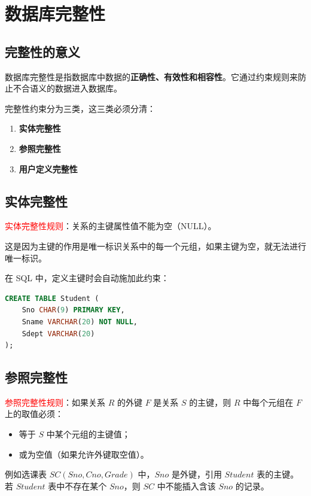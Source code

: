 \documentclass{../../note}
\begin{document}
\section{数据库完整性}

\subsection{完整性的意义}

数据库完整性是指数据库中数据的\textbf{正确性、有效性和相容性}。它通过约束规则来防止不合语义的数据进入数据库。

完整性约束分为三类，这三类必须分清：

\begin{enumerate}
  \item \textbf{实体完整性}
  \item \textbf{参照完整性}
  \item \textbf{用户定义完整性}
\end{enumerate}

\subsection{实体完整性}

\textcolor{red}{实体完整性规则}：关系的主键属性值不能为空（NULL）。

这是因为主键的作用是唯一标识关系中的每一个元组，如果主键为空，就无法进行唯一标识。

在 SQL 中，定义主键时会自动施加此约束：

\begin{lstlisting}[language=SQL]
CREATE TABLE Student (
    Sno CHAR(9) PRIMARY KEY,
    Sname VARCHAR(20) NOT NULL,
    Sdept VARCHAR(20)
);
\end{lstlisting}

\subsection{参照完整性}

\textcolor{red}{参照完整性规则}：如果关系 $R$ 的外键 $F$ 是关系 $S$ 的主键，则 $R$ 中每个元组在 $F$ 上的取值必须：

\begin{itemize}
  \item 等于 $S$ 中某个元组的主键值；
  \item 或为空值（如果允许外键取空值）。
\end{itemize}

例如选课表 $SC(Sno, Cno, Grade)$ 中，$Sno$ 是外键，引用 $Student$ 表的主键。若 $Student$ 表中不存在某个 $Sno$，则 $SC$ 中不能插入含该 $Sno$ 的记录。
\end{document}
